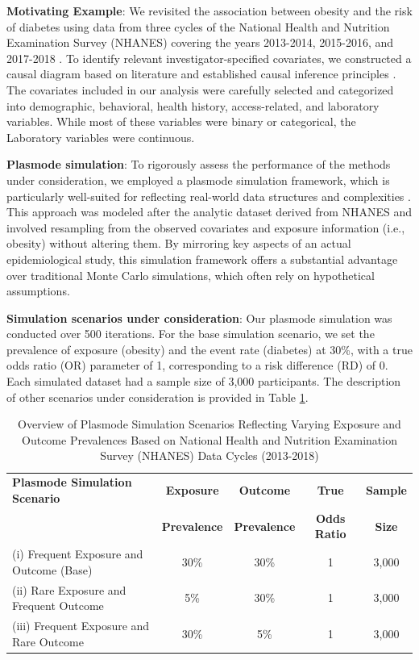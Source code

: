 \documentclass[sn-vancouver,Numbered,lineno,pdflatex]{sn-jnl}
\begin{document}
\textbf{Motivating Example}: We revisited the association between
obesity and the risk of diabetes using data from three cycles of the
National Health and Nutrition Examination Survey (NHANES) covering the
years 2013-2014, 2015-2016, and 2017-2018 \citep{karim2024high}. To
identify relevant investigator-specified covariates, we constructed a
causal diagram based on literature
\citep{saydah2014trends, liu2013association, kabadi2012joint, ostchega2012abdominal}
and established causal inference principles \citep{greenland1999causal}.
The covariates included in our analysis were carefully selected and
categorized into demographic, behavioral, health history,
access-related, and laboratory variables. While most of these variables
were binary or categorical, the Laboratory variables were continuous.

\textbf{Plasmode simulation}: To rigorously assess the performance of
the methods under consideration, we employed a plasmode simulation
framework, which is particularly well-suited for reflecting real-world
data structures and complexities \citep{franklin2014plasmode}. This
approach was modeled after the analytic dataset derived from NHANES and
involved resampling from the observed covariates and exposure
information (i.e., obesity) without altering them. By mirroring key
aspects of an actual epidemiological study, this simulation framework
offers a substantial advantage over traditional Monte Carlo simulations,
which often rely on hypothetical assumptions.

\textbf{Simulation scenarios under consideration}: Our plasmode
simulation was conducted over 500 iterations. For the base simulation
scenario, we set the prevalence of exposure (obesity) and the event rate
(diabetes) at 30\%, with a true odds ratio (OR) parameter of 1,
corresponding to a risk difference (RD) of 0. Each simulated dataset had
a sample size of 3,000 participants. The description of other scenarios
under consideration is provided in Table \ref{table:scenarios}.

\begin{table}[ht]
\centering
\caption{Overview of Plasmode Simulation Scenarios Reflecting Varying Exposure and Outcome Prevalences Based on National Health and Nutrition Examination Survey (NHANES) Data Cycles (2013-2018)}
\label{table:scenarios}
\begin{tabular}{lcccc}
  \toprule
  \textbf{Plasmode Simulation Scenario} & \textbf{Exposure} & \textbf{Outcome} & \textbf{True} & \textbf{Sample}\\
  \textbf{} & \textbf{Prevalence} & \textbf{Prevalence} & \textbf{Odds Ratio} & \textbf{Size}\\
  \midrule
  (i) Frequent Exposure and Outcome (Base) & 30\% & 30\% & 1 & 3,000 \\
  (ii) Rare Exposure and Frequent Outcome & 5\% & 30\% & 1 & 3,000 \\
  (iii) Frequent Exposure and Rare Outcome & 30\% & 5\% & 1 & 3,000 \\
  \bottomrule
\end{tabular}
\end{table}
\end{document}
